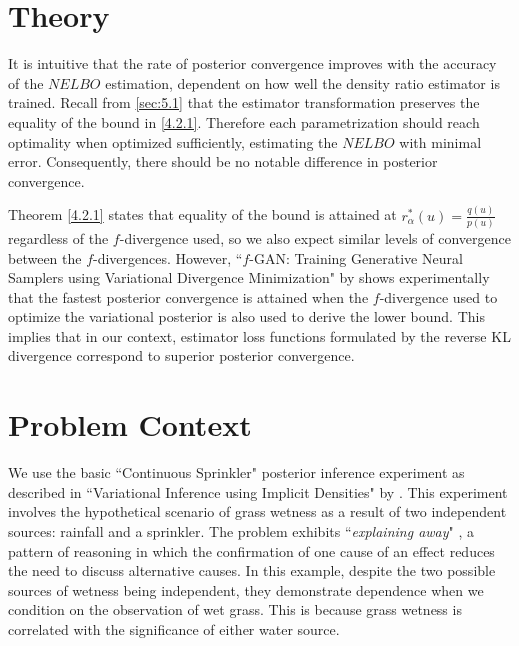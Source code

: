 \documentclass[honours,12pt, twoside]{unswthesis}
\numberwithin{equation}{section}
\theoremstyle{definition}
\begin{document}
\section{Theory}
It is intuitive that the rate of posterior convergence improves with the accuracy of the $NELBO$ estimation, dependent on how well the density ratio estimator is trained. Recall from \autoref{sec:5.1} that the estimator transformation preserves the equality of the bound in \autoref{4.2.1}. Therefore each parametrization should reach optimality when optimized sufficiently, estimating the $NELBO$ with minimal error. Consequently, there should be no notable difference in posterior convergence.

Theorem \ref{4.2.1} states that equality of the bound is attained at $r^*_\alpha(u)=\frac{q(u)}{p(u)}$ regardless of the $f$-divergence used, so we also expect similar levels of convergence between the $f$-divergences. However, ``$f$-GAN: Training Generative Neural Samplers using Variational Divergence Minimization" by \citet{nowozin} shows experimentally that the fastest posterior convergence is attained when the $f$-divergence used to optimize the variational posterior is also used to derive the lower bound. This implies that in our context, estimator loss functions formulated by the reverse KL divergence correspond to superior posterior convergence.
\section{Problem Context}
We use the basic ``Continuous Sprinkler" posterior inference experiment as described in ``Variational Inference using Implicit Densities" by \citet{huszar}. This experiment involves the hypothetical scenario of grass wetness as a result of two independent sources: rainfall and a sprinkler. The problem exhibits ``\textit{explaining away}" \citep{explain}, a pattern of reasoning in which the confirmation of one cause of an effect reduces the need to discuss alternative causes. In this example, despite the two possible sources of wetness being independent, they demonstrate dependence when we condition on the observation of wet grass. This is because grass wetness is correlated with the significance of either water source.
\end{document}
